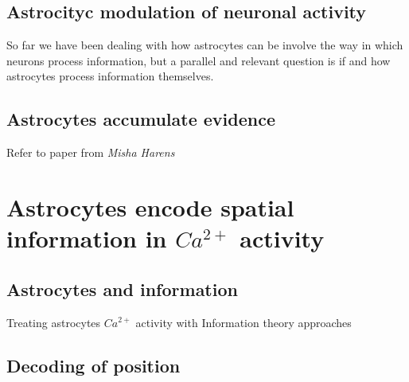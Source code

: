\subsection{Astrocityc modulation of neuronal activity}
\label{chap1:sec:2:subsec2:astro_neuromodulation}

So far we have been dealing with how astrocytes can be involve the way in which neurons process information, but a parallel and relevant question is if and how astrocytes process information themselves. 
\subsection{Astrocytes accumulate evidence}
\label{chap1:sec:2:subsec4:astro_evidence}
Refer to paper from \textit{Misha Harens}

\section{Astrocytes encode spatial information in $Ca^{2+}$ activity}
\label{chap1:sec3:astro_spat_info}

\subsection{Astrocytes and information}
\label{chap1:sec:3:subsec1:astro_info}
Treating astrocytes $Ca^{2+}$ activity with Information theory approaches

\subsection{Decoding of position}
\label{chap1:sec:3:subsec2:position_decoding}


